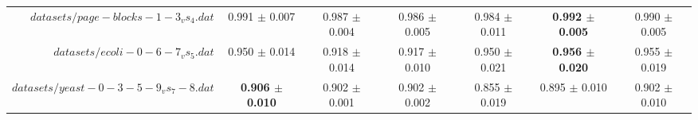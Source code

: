 \begin{table}[!ht]
{\begin{tabular}{r c c c c c c}
$datasets/page-blocks-1-3_vs_4.dat$ & 0.991 $\pm$ 0.007 & 0.987 $\pm$ 0.004 & 0.986 $\pm$ 0.005 & 0.984 $\pm$ 0.011 & \textbf{0.992 $\pm$ 0.005} & 0.990 $\pm$ 0.005 \\
$datasets/ecoli-0-6-7_vs_5.dat$ & 0.950 $\pm$ 0.014 & 0.918 $\pm$ 0.014 & 0.917 $\pm$ 0.010 & 0.950 $\pm$ 0.021 & \textbf{0.956 $\pm$ 0.020} & 0.955 $\pm$ 0.019 \\
$datasets/yeast-0-3-5-9_vs_7-8.dat$ & \textbf{0.906 $\pm$ 0.010} & 0.902 $\pm$ 0.001 & 0.902 $\pm$ 0.002 & 0.855 $\pm$ 0.019 & 0.895 $\pm$ 0.010 & 0.902 $\pm$ 0.010 \\
\end{tabular}}
\end{table}
